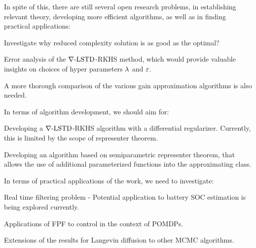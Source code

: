 In spite of this, there are still several open research problems, in establishing relevant theory, developing more efficient algorithms, as well as in finding practical applications: 
\begin{romannum}
\item Investigate why reduced complexity solution is as good as the optimal?
\item Error analysis of the $\nabla\text{-LSTD}$-RKHS method, which would provide valuable insights on choices of hyper parameters $\lambda$ and $\varepsilon$.
\item A more thorough comparison of the various gain approximation algorithms is also needed.
\end{romannum}

In terms of algorithm development, we should aim for:
\begin{romannum}
\item Developing a $\nabla\text{-LSTD}$-RKHS algorithm with a differential regularizer. Currently, this is limited by the scope of representer theorem. 
\item Developing an algorithm based on semiparametric representer theorem, that allows the use of additional parameterized functions into the approximating class.
\end{romannum}
In terms of practical applications of the work, we need to investigate:
\begin{romannum}
\item  Real time filtering problem - Potential application to battery SOC estimation is being explored currently. 
\item Applications of FPF to control in the context of POMDPs.
\item Extensions of the results for Langevin diffusion to other MCMC algorithms.
\end{romannum}

